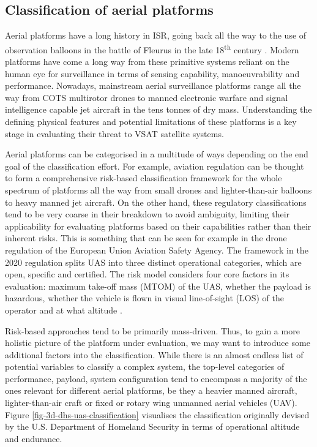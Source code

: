 \documentclass[english, 12pt, a4paper, elec, utf8, a-1b, online]{aaltothesis}
\begin{document}
\subsection{Classification of aerial platforms} \label{ch-aerial-platforms}

Aerial platforms have a long history in ISR, going back all the way to the use of observation balloons in the battle of Fleurus in the late 18\textsuperscript{th} century \cite{centennial-balloons-fleurus}.
Modern platforms have come a long way from these primitive systems reliant on the human eye for surveillance in terms of sensing capability, manoeuvrability and performance.
Nowadays, mainstream aerial surveillance platforms range all the way from COTS multirotor drones to manned electronic warfare and signal intelligence capable jet aircraft in the tens tonnes of dry mass.
Understanding the defining physical features and potential limitations of these platforms is a key stage in evaluating their threat to VSAT satellite systems.

Aerial platforms can be categorised in a multitude of ways depending on the end goal of the classification effort.
For example, aviation regulation can be thought to form a comprehensive risk-based classification framework for the whole spectrum of platforms all the way from small drones and lighter-than-air balloons to heavy manned jet aircraft.
On the other hand, these regulatory classifications tend to be very coarse in their breakdown to avoid ambiguity, limiting their applicability for evaluating platforms based on their capabilities rather than their inherent risks.
This is something that can be seen for example in the drone regulation of the European Union Aviation Safety Agency.
The framework in the 2020 regulation splits UAS into three distinct operational categories, which are open, specific and certified.
The risk model considers four core factors in its evaluation: maximum take-off mass (MTOM) of the UAS, whether the payload is hazardous, whether the vehicle is flown in visual line-of-sight (LOS) of the operator and at what altitude \cite{alamouri2021exploratory}.

Risk-based approaches tend to be primarily mass-driven. Thus, to gain a more holistic picture of the platform under evaluation, we may want to introduce some additional factors into the classification.
While there is an almost endless list of potential variables to classify a complex system, the top-level categories of performance, payload, system configuration tend to encompass a majority of the ones relevant for different aerial platforms, be they a heavier manned aircraft, lighter-than-air craft or fixed or rotary wing unmanned aerial vehicles (UAV).
Figure \ref{fig-3d-dhs-uas-classification} visualises the classification originally devised by the U.S.
Department of Homeland Security in terms of operational altitude and endurance.
\end{document}

